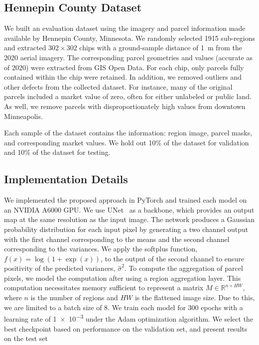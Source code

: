 \documentclass[10pt,twocolumn,a4paper]{article}
\newcommand{\cash}[1]{\SI{#1}[\$]{}}
\begin{document}
\subsection{Hennepin County Dataset}
\label{sec:hennepin}

We built an evaluation dataset using the imagery and parcel information made available by Hennepin County, Minnesota. We randomly selected 1915 sub-regions and extracted $302 \times 302$ chips with a ground-sample distance of \SI{1}{\meter} from the 2020 aerial imagery. The corresponding parcel geometries and values (accurate as of 2020) were extracted from GIS Open Data. For each chip, only parcels fully contained within the chip were retained. In addition, we removed outliers and other defects from the collected dataset. For instance, many of the original parcels included a market value of zero, often for either unlabeled or public land. As well, we remove parcels with disproportionately high values from downtown Minneapolis. 

Each sample of the dataset contains the information: region image, parcel masks, and corresponding market values. We hold out 10\% of the dataset for validation and 10\% of the dataset for testing.


\subsection{Implementation Details}

We implemented the proposed approach in PyTorch and trained each model on an NVIDIA A6000 GPU. We use UNet~\cite{ronneberger2015u} as a backbone, which provides an output map at the same resolution as the input image. The network produces a Gaussian probability distribution for each input pixel by generating a two channel output with the first channel corresponding to the means and the second channel corresponding to the variances. We apply the softplus function, $f(x) = \log(1+ \exp{(x)})$, to the output of the second channel to ensure positivity of the predicted variances, $\hat{\sigma}^2$. To compute the aggregation of parcel pixels, we model the computation after \cite{jacobs2018weakly} using a region aggregation layer. This computation necessitates memory sufficient to represent a matrix $M \in \mathbb{R}^{n \times HW}$, where $n$ is the number of regions and $HW$ is the flattened image size. Due to this, we are limited to a batch size of 8. We train each model for \num{300} epochs with a learning rate of \num{1e-3} under the Adam optimization algorithm. We select the best checkpoint based on performance on the validation set, and present results on the test set
\end{document}
